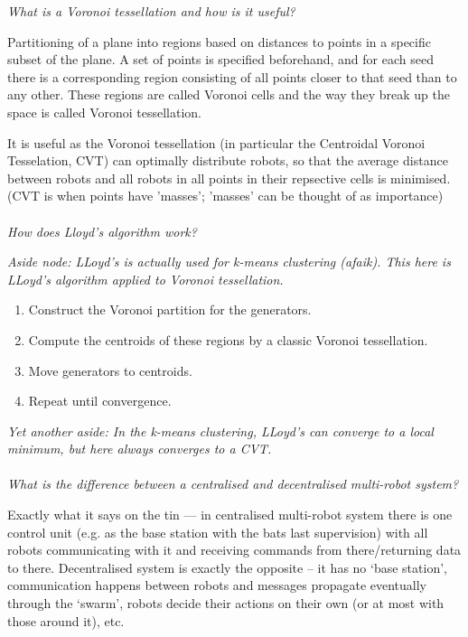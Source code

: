 \documentclass[12pt]{article}
\newcommand*\circled[1]{\tikz[baseline=(char.base)]{
		\node[shape=circle,draw,inner sep=0pt] (char) {#1};}}
\begin{document}
\textit{\circled{6.} What is a Voronoi tessellation and how is it useful?}

Partitioning of a plane into regions based on distances to points in a specific
subset of the plane. A set of points is specified beforehand, and for each seed
there is a corresponding region consisting of all points closer to that seed
than to any other. These regions are called Voronoi cells and the way they 
break up the space is called Voronoi tessellation.

It is useful as the Voronoi tessellation (in particular the Centroidal Voronoi
Tesselation, CVT) can optimally distribute robots, so that the average distance
between robots and all robots in all points in their repsective cells is
minimised. (CVT is when points have 'masses'; 'masses' can be thought of as
importance)
\\
\\
\textit{\circled{7.} How does Lloyd's algorithm work?}

\textit{Aside node: LLoyd's is actually used for k-means clustering (afaik). This here
is LLoyd's algorithm applied to Voronoi tessellation.}

\begin{enumerate}
    \item Construct the Voronoi partition for the generators.
    \item Compute the centroids of these regions by a classic Voronoi
        tessellation.
    \item  Move generators to centroids.
    \item Repeat until convergence.
\end{enumerate}

\textit{Yet another aside: In the k-means clustering, LLoyd's can converge to
a local minimum, but here always converges to a CVT.}
\\
\\
\textit{\circled{8.} What is the difference between a centralised and
decentralised multi-robot system?}

Exactly what it says on the tin --- in centralised multi-robot system there is
one control unit (e.g. as the base station with the bats last supervision) with
all robots communicating with it and receiving commands from there/returning
data to there. Decentralised system is exactly the opposite -- it has no `base
station', communication happens between robots and messages propagate
eventually through the `swarm', robots decide their actions on their own (or at
most with those around it), etc.
\end{document}

